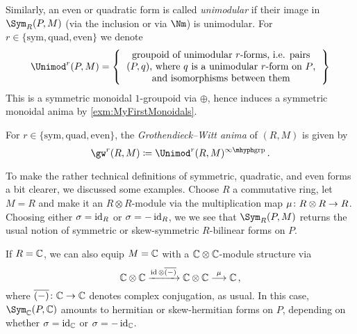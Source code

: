 \documentclass[a4paper, 10pt, oneside, DIV=9, chapterprefix=true, numbers=enddot,bibliography=totoc]{scrbook}
\begin{document}
Similarly, an even or quadratic form is called \emph{unimodular} if their image in $\Sym_R(P,M)$ (via the inclusion or via $\Nm$) is unimodular. For $r\in\{\text{sym},\text{quad}, \text{even}\}$ we denote
\begin{equation*}
	\Unimod^r(P,M)=\left\{\begin{tabular}{c}
		groupoid of unimodular $r$-forms, i.e. pairs\\
		$(P,q)$, where $q$ is a unimodular $r$-form on $P$,\\
		and isomorphisms between them
	\end{tabular}\right\}
\end{equation*}
This is a symmetric monoidal $1$-groupoid via $\oplus$, hence induces a symmetric monoidal anima by \cref{exm:MyFirstMonoidals}.
\begin{defi}[Karoubi]
	For $r\in\{\text{sym},\text{quad}, \text{even}\}$, the \emph{Grothendieck--Witt anima} of $(R,M)$ is given by
	\begin{equation*}
		\gw^r(R,M)\coloneqq \Unimod^r(R,M)^\inftygrp\,.
	\end{equation*}
\end{defi}
To make the rather technical definitions of symmetric, quadratic, and even forms a bit clearer, we discussed some examples. Choose $R$ a commutative ring, let $M=R$ and make it an $R\otimes R$-module via the multiplication map $\mu\colon R\otimes R\morphism R$. Choosing either $\sigma=\operatorname{id}_R$ or $\sigma=-\operatorname{id}_R$, we we see that $\Sym_R(P,M)$ returns the usual notion of symmetric or skew-symmetric $R$-bilinear forms on $P$.

If $R=\mathbb{C}$, we can also equip $M=\mathbb{C}$ with a $\mathbb{C}\otimes\mathbb{C}$-module structure via
\begin{equation*}
	\IC\otimes\IC\xrightarrow{\id\otimes \overline{(-)}}\IC\otimes \IC\morphism[\mu]\IC\,,
\end{equation*}
where $\overline{(-)}\colon \IC\morphism\IC$ denotes complex conjugation, as usual. In this case, $\Sym_\IC(P,\IC)$ amounts to hermitian or skew-hermitian forms on $P$, depending on whether $\sigma=\operatorname{id}_{\mathbb{C}}$ or $\sigma=-\operatorname{id}_{\mathbb{C}}$.
\end{document}
